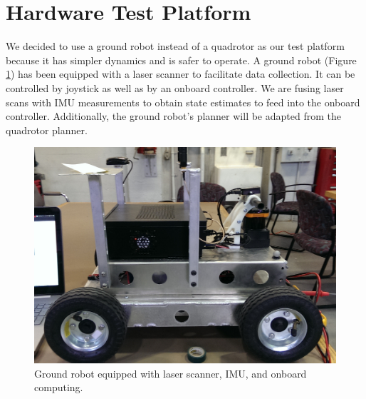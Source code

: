 \documentclass{article}
\begin{document}
\section{Hardware Test Platform}
We decided to use a ground robot instead of a quadrotor as our test platform because it has simpler dynamics and is safer to operate.
A ground robot (Figure \ref{fig:ground_robot}) has been equipped with a laser scanner to facilitate data collection.
It can be controlled by joystick as well as by an onboard controller.
We are fusing laser scans with IMU measurements to obtain state estimates to feed into the onboard controller.
Additionally, the ground robot's planner will be adapted from the quadrotor planner.

\begin{figure}[!htbp]
\centering
\includegraphics[width=4.5in]{ground_robot.png}
\caption{Ground robot equipped with laser scanner, IMU, and onboard computing.}
\label{fig:ground_robot}
\end{figure}
\end{document}
